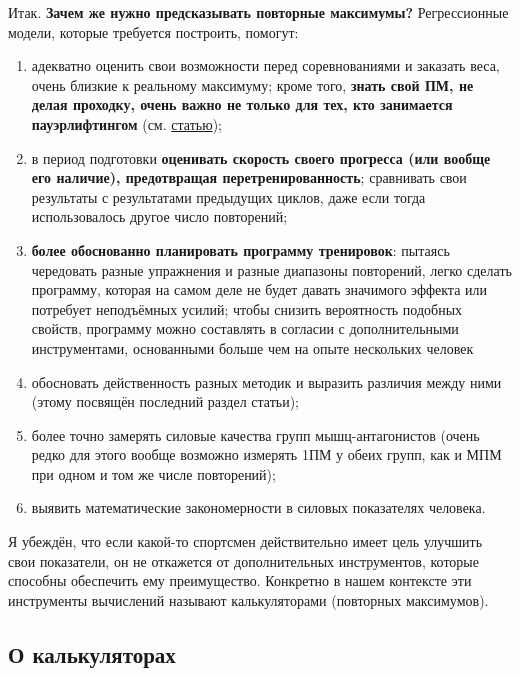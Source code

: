 \documentclass[
]{article}
\begin{document}
Итак. \textbf{Зачем же нужно предсказывать повторные максимумы?}
Регрессионные модели, которые требуется построить, помогут:

\begin{enumerate}
\def\labelenumi{\arabic{enumi}.}
\item
  адекватно оценить свои возможности перед соревнованиями и заказать
  веса, очень близкие к реальному максимуму; кроме того, \textbf{знать
  свой ПМ, не делая проходку, очень важно не только для тех, кто
  занимается пауэрлифтингом} (см.
  \href{https://body1.ru/kalkulyator-odnopovtornogo-maksimuma-1pm/}{статью});
\item
  в период подготовки \textbf{оценивать скорость своего прогресса (или
  вообще его наличие), предотвращая перетренированность}; сравнивать
  свои результаты с результатами предыдущих циклов, даже если тогда
  использовалось другое число повторений;
\item
  \textbf{более обоснованно планировать программу тренировок}: пытаясь
  чередовать разные упражнения и разные диапазоны повторений, легко
  сделать программу, которая на самом деле не будет давать значимого
  эффекта или потребует неподъёмных усилий; чтобы снизить вероятность
  подобных свойств, программу можно составлять в согласии с
  дополнительными инструментами, основанными больше чем на опыте
  нескольких человек
\item
  обосновать действенность разных методик и выразить различия между ними
  (этому посвящён последний раздел статьи);
\item
  более точно замерять силовые качества групп мышц-антагонистов (очень
  редко для этого вообще возможно измерять 1ПМ у обеих групп, как и МПМ
  при одном и том же числе повторений);
\item
  выявить математические закономерности в силовых показателях человека.
\end{enumerate}

Я убеждён, что если какой-то спортсмен действительно имеет цель улучшить
свои показатели, он не откажется от дополнительных инструментов, которые
способны обеспечить ему преимущество. Конкретно в нашем контексте эти
инструменты вычислений называют калькуляторами (повторных максимумов).

\hypertarget{ux43e-ux43aux430ux43bux44cux43aux443ux43bux44fux442ux43eux440ux430ux445}{%
\subsection{О
калькуляторах}\label{ux43e-ux43aux430ux43bux44cux43aux443ux43bux44fux442ux43eux440ux430ux445}}
\end{document}
